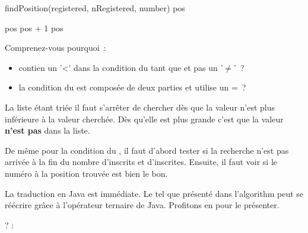 			\begin{pseudocode}
					 \Gets 
						findPosition(registered, nRegistered, number)
						\Return pos
					\Else
					\EndIf
				\EndAlgo
				
				\Empty
					 
						\Let pos \Gets pos + 1
					\EndWhile
					\Return pos
				\EndAlgo
			\end{pseudocode}
			
			Comprenez-vous pourquoi~:
			\begin{itemize}
			\item
				 contien un '<' dans la 
				condition du tant que et pas un '$\neq$'~?
			\item
				la condition du  est composée de deux parties
				et utilise un =~?
			\end{itemize}

			La liste étant triée il faut s'arrêter de chercher dès que la valeur
			n'est plus inférieure à la valeur cherchée. Dès qu'elle est plus
			grande c'est que la valeur \textbf{n'est pas} dans la liste. 

			De même pour la condition du , il faut d'abord tester si la
			recherche n'est pas arrivée à la fin du nombre d'inscrits et
			d'inscrites. Ensuite, il faut voir si le numéro à la position
			trouvée est bien le bon. 

			La traduction en Java est immédiate. Le  tel que présenté
			dans l'algorithm peut se réécrire grâce à l'opérateur
			ternaire de Java. Profitons en pour le présenter. 

			\begin{grammaire}
				     ?  : 
			\end{grammaire}

